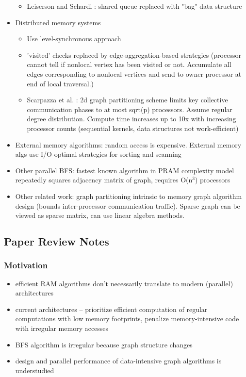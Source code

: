 \begin{itemize}
\begin{itemize}
        \item Leiserson and Schardl : shared queue replaced with "bag" data structure
    \end{itemize}
    \item Distributed memory systems
    \begin{itemize}
        \item Use level-synchronous approach
        \item 'visited' checks replaced by edge-aggregation-based strategies (processor cannot tell if nonlocal vertex has been visited or not. Accumulate all edges corresponding to nonlocal vertices and send to owner processor at end of local traversal.)
        \item Scarpazza et al. : 2d graph partitioning scheme limits key collective communication phases to at most sqrt(p) processors. Assume regular degree distribution. Compute time increases up to 10x with increasing processor counts (sequential kernels, data structures not work-efficient)
    \end{itemize}
    \item External memory algorithms: random access is expensive. External memory algs use I/O-optimal strategies for sorting and scanning
    \item Other parallel BFS: fastest known algorithm in PRAM complexity model repeatedly squares adjacency matrix of graph, requires O(n$^3$) processors
    \item Other related work: graph partitioning intrinsic to memory graph algorithm design (bounds inter-processor communication traffic). Sparse graph can be viewed as sparse matrix, can use linear algebra methods. 
\end{itemize}

\subsection{Paper Review Notes}

\subsubsection{Motivation}

\begin{itemize}
    \item efficient RAM algorithms don't necessarily translate to modern (parallel) architectures
    \item current architectures -- prioritize efficient computation of regular computations with low memory footprints, penalize memory-intensive code with irregular memory accesses
    \item BFS algorithm is irregular because graph structure changes
    \item design and parallel performance of data-intensive graph algorithms is understudied
\end{itemize}

